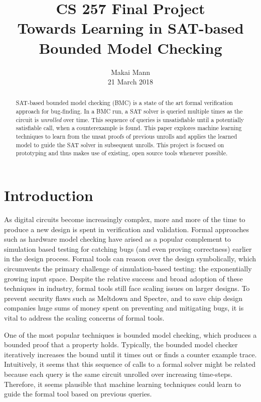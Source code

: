 \documentclass[letterpaper]{article} %
\begin{document}
%
\title{CS 257 Final Project \\ Towards Learning in SAT-based Bounded Model Checking}
\author{Makai Mann \\
21 March 2018
}
\maketitle
\begin{abstract}
SAT-based bounded model checking (BMC) is a state of the art formal verification approach for bug-finding. In a BMC run, a SAT solver is queried multiple times as the circuit is \textit{unrolled} over time. This sequence of queries is unsatisfiable until a potentially satisfiable call, when a counterexample is found. This paper explores machine learning techniques to learn from the unsat proofs of previous unrolls and applies the learned model to guide the SAT solver in subsequent unrolls. This project is focused on prototyping and thus makes use of existing, open source tools whenever possible.
\end{abstract}

\section{Introduction}
\noindent As digital circuits become increasingly complex, more and more of the time to produce a new design is spent in verification and validation. Formal approaches such as hardware model checking have arised as a popular complement to simulation based testing for catching bugs (and even proving correctness) earlier in the design process. Formal tools can reason over the design symbolically, which circumvents the primary challenge of simulation-based testing: the exponentially growing input space. Despite the relative success and broad adoption of these techniques in industry, formal tools still face scaling issues on larger designs. To prevent security flaws such as Meltdown and Spectre, and to save chip design companies huge sums of money spent on preventing and mitigating bugs, it is vital to address the scaling concerns of formal tools.

One of the most popular techniques is bounded model checking, which produces a bounded proof that a property holds. Typically, the bounded model checker iteratively increases the bound until it times out or finds a counter example trace. Intuitively, it seems that this sequence of calls to a formal solver might be related because each query is the same circuit unrolled over increasing time-steps. Therefore, it seems plausible that machine learning techniques could learn to guide the formal tool based on previous queries.
\end{document}
